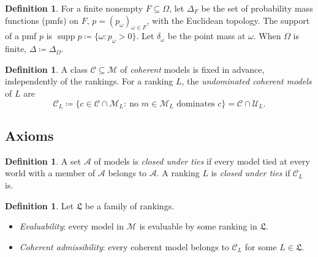 \documentclass[11pt]{article}
\theoremstyle{definition}
\newtheorem{definition}[theorem]{Definition}
\newcommand{\M}{\mathcal M}
\newcommand{\C}{\mathcal C}
\newcommand{\U}{\mathcal U}
\newcommand{\Lf}{\mathfrak L}
\newcommand{\supp}{\operatorname{supp}}
\begin{document}
\begin{definition}\label{def:priors}
For a finite nonempty $F\subseteq\Omega$, let $\Delta_F$ be the set of probability mass functions (pmfs) on $F$, $p=(p_\omega)_{\omega\in F}$, with the Euclidean topology. The support of a pmf $p$ is $\supp p\coloneqq\{\omega:p_\omega>0\}$. Let $\delta_\omega$ be the point mass at $\omega$. When $\Omega$ is finite, $\Delta\coloneqq\Delta_\Omega$.
\end{definition}

\begin{definition}\label{def:coherence-property}
A class $\C\subseteq\M$ of \emph{coherent} models is fixed in advance, independently of the rankings. For a ranking $L$, the \emph{undominated coherent models} of $L$ are
\[
\C_L\coloneqq\{c\in\C\cap\M_L:\ \text{no } m\in\M_L \text{ dominates } c\}=\C\cap\U_L.
\]
\end{definition}

\subsection{Axioms}

\begin{definition}\label{def:tie-closure}
A set $\mathcal A$ of models is \emph{closed under ties} if every model tied at every world with a member of $\mathcal A$ belongs to $\mathcal A$. A ranking $L$ is \emph{closed under ties} if $\C_L$ is.
\end{definition}

\begin{definition}\label{def:family-assumptions}
Let $\Lf$ be a family of rankings.
\begin{itemize}[leftmargin=*]
\item \emph{Evaluability}: every model in $\M$ is evaluable by some ranking in $\Lf$.
\item \emph{Coherent admissibility}: every coherent model belongs to $\C_L$ for some $L\in\Lf$.
\end{itemize}
\end{definition}
\end{document}
